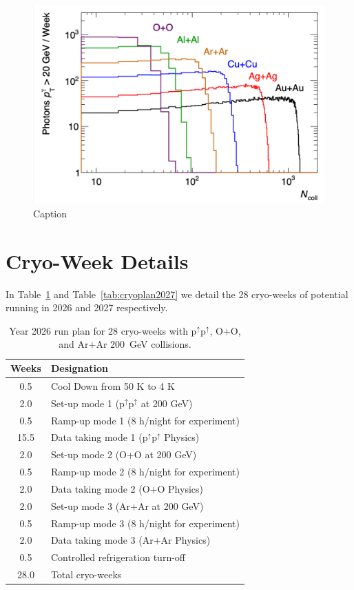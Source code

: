 \begin{figure}
    \centering
    \includegraphics[width=0.85\linewidth]{figs/figure_small_perweek.png}
    \caption{Caption}
    \label{fig:figSmallPhoton}
\end{figure}


\newpage
\section{Cryo-Week Details}
\label{sec:cryo20262027}

In Table~\ref{tab:cryoplan2026} and Table~\ref{tab:cryoplan2027} we detail the 28 cryo-weeks of potential running in 2026 and 2027 respectively.

\begin{table}
\centering
\begin{tabular}{ | c | l | }
\hline
Weeks & Designation \\ \hline
0.5  & Cool Down from 50 K to 4 K \\ \hline
2.0  & Set-up mode 1 (p$^{\uparrow}$p$^{\uparrow}$ at 200 GeV) \\ \hline
0.5  & Ramp-up mode 1 (8 h/night for experiment) \\ \hline
15.5 & Data taking mode 1 (p$^{\uparrow}$p$^{\uparrow}$ Physics) \\ \hline
2.0  & Set-up mode 2 (O+O at 200 GeV) \\ \hline
0.5  & Ramp-up mode 2 (8 h/night for experiment) \\ \hline
2.0 & Data taking mode 2 (O+O Physics) \\ \hline
2.0  & Set-up mode 3 (Ar+Ar at 200 GeV) \\ \hline
0.5  & Ramp-up mode 3 (8 h/night for experiment) \\ \hline
2.0 & Data taking mode 3 (Ar+Ar Physics) \\ \hline
0.5  & Controlled refrigeration turn-off \\ \hline \hline \hline
28.0 & Total cryo-weeks \\
\hline
\end{tabular}
\caption{Year 2026 run plan for 28 cryo-weeks with p$^{\uparrow}$p$^{\uparrow}$, O+O, and Ar+Ar 200~GeV collisions.\label{tab:cryoplan2026}}
\end{table}



